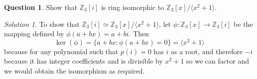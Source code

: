 \documentclass[11pt]{amsart}
\theoremstyle{definition}\newtheorem{question}{Question}
\theoremstyle{definition}\newtheorem{claim}{Claim}
\theoremstyle{remark}\newtheorem*{solution}{Solution}
\newcommand{\Z}{\mathbb{Z}}
\begin{document}
\newpage

\begin{question}
    Show that $\Z_3[i]$ is ring isomorphic to $\Z_3[x]/\langle{x^2 + 1}\rangle$.
\end{question}

\begin{solution}
    To show that $\Z_3[i] \simeq \Z_3[x]/\langle{x^2 + 1}\rangle$, let $\phi : \Z_3[x] \to \Z_3[i]$ be the mapping defined by $\phi(a + bx) = a + bi$. Then
    \begin{equation*}
        \ker(\phi) = \{a + bx : \phi(a + bx) = 0\} = \langle{x^2 + 1}\rangle
    \end{equation*}
    because for any polynomial such that $p(i) = 0$ has $i$ as a root, and therefore $-i$ because it has integer coefficients and is divisible by $x^2 + 1$ so we can factor and we would obtain the isomorphism as required.
\end{solution}
\end{document}
